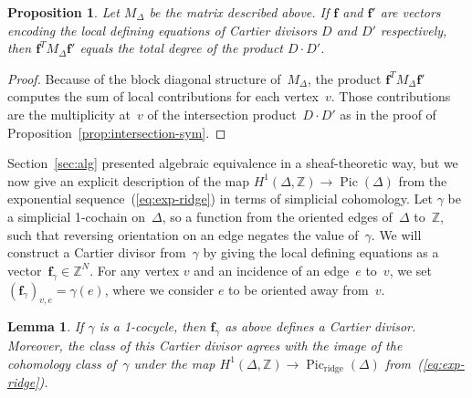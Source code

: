 \documentclass[11pt]{amsart}
\newtheorem{lem}[thm]{Lemma}
\newtheorem{prop}[thm]{Proposition}
\theoremstyle{definition}
\newcommand{\bff}{\mathbf f}
\newcommand{\Pic}{\operatorname{Pic}}
\newcommand{\ridge}{\operatorname{ridge}}
\newcommand{\ZZ}{\mathbb Z}
\begin{document}
\begin{prop}\label{prop:matrix-intersections}
Let $M_\Delta$ be the matrix described above. If $\bff$ and $\bff'$ are vectors
encoding the local defining equations of Cartier divisors $D$ and $D'$
respectively, then $\bff^T M_\Delta \bff'$ equals the total degree of the
product $D \cdot D'$.
\end{prop}

\begin{proof}
Because of the block diagonal structure of~$M_\Delta$, the product $\bff^T
M_\Delta \bff'$ computes the sum of local contributions for each vertex~$v$.
Those contributions are the multiplicity at~$v$ of the intersection product~$D
\cdot D'$ as in the proof of Proposition~\ref{prop:intersection-sym}.
\end{proof}

Section~\ref{sec:alg} presented algebraic equivalence in a sheaf-theoretic way,
but we now give an explicit description of the map $H^1(\Delta, \ZZ)
\rightarrow \Pic(\Delta)$ from the exponential sequence~(\ref{eq:exp-ridge}) in
terms of simplicial cohomology.
Let $\gamma$ be a simplicial 1-cochain on~$\Delta$, so a function from the
oriented edges of~$\Delta$ to~$\ZZ$, such that reversing orientation on an edge
negates the value of~$\gamma$. We will construct a Cartier divisor from~$\gamma$
by giving the local defining equations as a vector~$\bff_\gamma \in \ZZ^N$. For
any vertex $v$ and an incidence of an edge~$e$ to~$v$, we set
$(\bff_\gamma)_{v,e} = \gamma(e)$, where we consider $e$ to be oriented away
from~$v$.

\begin{lem}\label{lem:cocycle}
If $\gamma$ is a 1-cocycle, then $\bff_\gamma$ as above defines a Cartier
divisor. Moreover, the class of this Cartier divisor agrees with the image
of the cohomology class of~$\gamma$ under the map $H^1(\Delta, \ZZ) \rightarrow
\Pic_{\ridge}(\Delta)$ from~(\ref{eq:exp-ridge}).
\end{lem}
\end{document}
